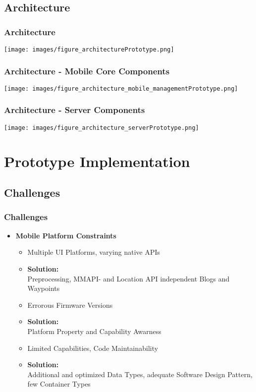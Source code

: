 \documentclass[blue]{beamer}
\begin{document}
\subsection{Architecture}
\frame
{
\frametitle{\textbf{Architecture}}
\texttt{[image: images/figure\_architecturePrototype.png]}
}

\frame
{
\frametitle{\textbf{Architecture - Mobile Core Components}}
\texttt{[image: images/figure\_architecture\_mobile\_managementPrototype.png]}
}

\frame
{
\frametitle{\textbf{Architecture - Server Components}}
\texttt{[image: images/figure\_architecture\_serverPrototype.png]}
}



\section{Prototype Implementation}

\subsection{Challenges}
\frame
{
\frametitle{\textbf{Challenges}}
\begin{itemize}
\item \textbf{Mobile Platform Constraints}
  \begin{itemize}[<+-|alert@+>]
    \item \color[rgb]{1.0,0.0,0.0} Multiple UI Platforms, varying native APIs
    \item \color[rgb]{0.0,0.7,0.0} \textbf{Solution:}\\ Preprocessing, MMAPI- and Location API independent Blogs and Waypoints 
    \item \color[rgb]{1.0,0.0,0.0} Errorous Firmware Versions
    \item \color[rgb]{0.0,0.7,0.0} \textbf{Solution:}\\Platform Property and Capability Awarness
    \item \color[rgb]{1.0,0.0,0.0} Limited Capabilities, Code Maintainability
    \item \color[rgb]{0.0,0.7,0.0} \textbf{Solution:}\\Additional and optimized Data Types, adequate Software Design Pattern, few Container Types
  \end{itemize}
\end{itemize}
}
\end{document}
